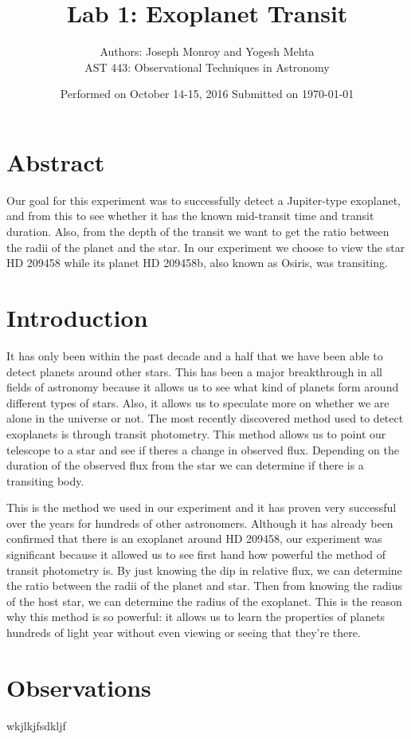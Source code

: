 \documentclass[12pt]{article}
\begin{document}
\title{Lab 1: Exoplanet Transit}
\author{Authors: Joseph Monroy and Yogesh Mehta \\ AST 443: Observational Techniques in Astronomy}
\date{Performed on October 14-15, 2016 \linebreak \linebreak Submitted on \today}
\maketitle
\section*{Abstract}
Our goal for this experiment was to successfully detect a Jupiter-type exoplanet, and from this to see whether it has the known mid-transit time and transit duration. Also, from the depth of the transit we want to get the ratio between the radii of the planet and the star. In our experiment we choose to view the star HD 209458 while its planet HD 209458b, also known as Osiris, was transiting. 

\section{Introduction}
It has only been within the past decade and a half that we have been able to detect planets around other stars. This has been a major breakthrough in all fields of astronomy because it allows us to see what kind of planets form around different types of stars. Also, it allows us to speculate more on whether we are alone in the universe or not. The most recently discovered method used to detect exoplanets is through transit photometry. This method allows us to point our telescope to a star and see if theres a change in observed flux. Depending on the duration of the observed flux from the star we can determine if there is a transiting body. 

This is the method we used in our experiment and it has proven very successful over the years for hundreds of other astronomers. Although it has already been confirmed that there is an exoplanet around HD 209458, our experiment was significant because it allowed us to see first hand how powerful the method of transit photometry is. By just knowing the dip in relative flux, we can determine the ratio between the radii of the planet and star. Then from knowing the radius of the host star, we can determine the radius of the exoplanet. This is the reason why this method is so powerful: it allows us to learn the properties of planets hundreds of light year without even viewing or seeing that they're there. 

\newpage
\section{Observations} 
wkjlkjfsdkljf
\end{document}
